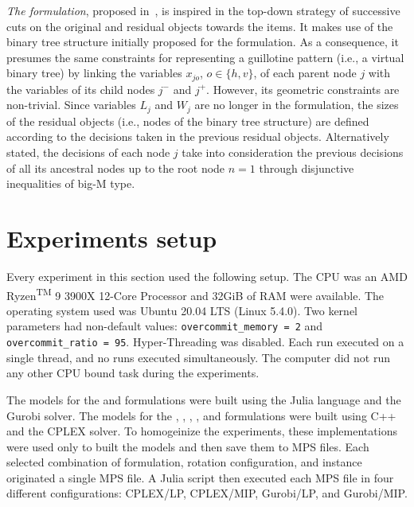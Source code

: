 \emph{The {\modelOrigami} formulation}, proposed in~\citet{martin:2020:top}, is inspired in the top-down strategy of successive cuts on the original and residual objects towards the items.
It makes use of the binary tree structure initially proposed for the {\modelHierarchical} formulation.
As a consequence, it presumes the same constraints for representing a guillotine pattern (i.e., a virtual binary tree) by linking the variables $x_{jo}$, $o \in \{h,v\}$, of each parent node $j$ with the variables of its child nodes $j^-$ and $j^+$.
However, its geometric constraints are non-trivial.
Since variables $L_j$ and $W_j$ are no longer in the formulation, the sizes of the residual objects (i.e., nodes of the binary tree structure) are defined according to the decisions taken in the previous residual objects.
Alternatively stated, the decisions of each node $j$ take into consideration the previous decisions of all its ancestral nodes up to the root node $n=1$ through disjunctive inequalities of big-M type.

\section{Experiments setup}
\label{sec:setup_other_formulations}

Every experiment in this section used the following setup.
The CPU was an AMD\textsuperscript{\textregistered} Ryzen\textsuperscript{TM} 9 3900X
 12-Core Processor %
and 32GiB of RAM were available. %
The operating system used was Ubuntu 20.04 LTS (Linux 5.4.0).
Two kernel parameters had non-default values: \texttt{overcommit\_memory = 2} and \texttt{overcommit\_ratio = 95}.
Hyper-Threading was disabled.
Each run executed on a single thread, and no runs executed simultaneously.
The computer did not run any other CPU bound task during the experiments.

The models for the {\modelBecker} and {\modelFMT} formulations were built using the Julia language and the Gurobi solver.
The models for the {\modelBCE}, {\modelGrid}, {\modelHierarchical}, {\modelImplicit}, and {\modelOrigami} formulations were built using C++ and the CPLEX solver.
To homogeinize the experiments, these implementations were used only to built the models and then save them to MPS files.
Each selected combination of formulation, rotation configuration, and instance originated a single MPS file.
A Julia script then executed each MPS file in four different configurations: CPLEX/LP, CPLEX/MIP, Gurobi/LP, and Gurobi/MIP.

